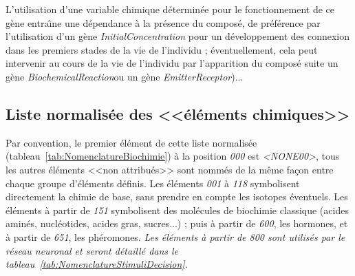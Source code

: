 \documentclass[11pt,twoside,a4paper]{article}
\begin{document}
\clearpage

L'utilisation d'une variable chimique d{\'e}termin{\'e}e pour le fonctionnement de ce g{\`e}ne entra{\^\i}ne une d{\'e}pendance {\`a} la pr{\'e}sence du compos{\'e}, de pr{\'e}f{\'e}rence par l'utilisation d'un g{\`e}ne \emph{InitialConcentration} pour un d{\'e}veloppement des connexion dans les premiers stades de la vie de l'individu ; {\'e}ventuellement, cela peut intervenir au cours de la vie de l'individu par l'apparition du compos{\'e} suite un g{\`e}ne \emph{BiochemicalReaction}ou un g{\`e}ne \emph{EmitterReceptor})...


\subsection{Liste normalis{\'e}e des <<{\'e}l{\'e}ments chimiques>>}

Par convention, le premier {\'e}l{\'e}ment de cette liste normalis{\'e}e (tableau~\ref{tab:NomenclatureBiochimie}) {\`a} la position \emph{000} est \emph{<NONE00>}, tous les autres {\'e}l{\'e}ments <<non attribu{\'e}s>> sont nomm{\'e}s de la m{\^e}me fa\c{c}on entre chaque groupe d'{\'e}l{\'e}ments d{\'e}finis. Les {\'e}l{\'e}ments \emph{001} {\`a} \emph{118} symbolisent directement la chimie de base, sans prendre en compte les isotopes {\'e}ventuels. Les {\'e}l{\'e}ments {\`a} partir de \emph{151} symbolisent des mol{\'e}cules de biochimie classique (acides amin{\'e}s, nucl{\'e}otides, acides gras, sucres...) ; puis {\`a} partir de \emph{600}, les hormones, et {\`a} partir de \emph{651}, les ph{\'e}romones. \textit{Les {\'e}l{\'e}ments {\`a} partir de \emph{800} sont utilis{\'e}s par le r{\'e}seau neuronal et seront d{\'e}taill{\'e} dans le tableau~\ref{tab:NomenclatureStimuliDecision}. }

\def\titreNormalise{Nomenclature des variables de chimie et biochimie}
\end{document}
